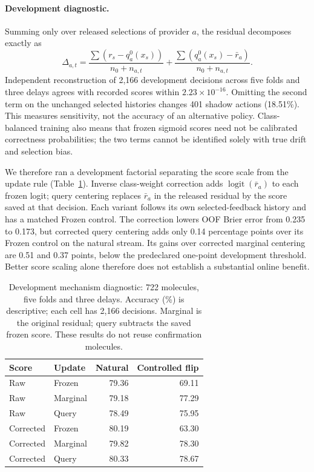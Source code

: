 \documentclass[sigconf,anonymous]{aamas}
\begin{document}
\paragraph{Development diagnostic.}
Summing only over released selections of provider $a$, the residual decomposes exactly as
\begin{equation}
\Delta_{a,t}=\frac{\sum(r_s-q_a^0(x_s))}{n_0+n_{a,t}}
            +\frac{\sum(q_a^0(x_s)-\bar r_a)}{n_0+n_{a,t}}.
\end{equation}
Independent reconstruction of 2,166 development decisions across five folds and three delays agrees with recorded scores within $2.23\times10^{-16}$. Omitting the second term on the unchanged selected histories changes 401 shadow actions (18.51\%). This measures sensitivity, not the accuracy of an alternative policy. Class-balanced training also means that frozen sigmoid scores need not be calibrated correctness probabilities; the two terms cannot be identified solely with true drift and selection bias.

We therefore ran a development factorial separating the score scale from the update rule (Table~\ref{tab:centering-diagnostic}). Inverse class-weight correction adds $\operatorname{logit}(\bar r_a)$ to each frozen logit; query centering replaces $\bar r_a$ in the released residual by the score saved at that decision. Each variant follows its own selected-feedback history and has a matched Frozen control. The correction lowers OOF Brier error from 0.235 to 0.173, but corrected query centering adds only 0.14 percentage points over its Frozen control on the natural stream. Its gains over corrected marginal centering are 0.51 and 0.37 points, below the predeclared one-point development threshold. Better score scaling alone therefore does not establish a substantial online benefit.

\begin{table}[t]
\caption{Development mechanism diagnostic: 722 molecules, five folds and three delays. Accuracy (\%) is descriptive; each cell has 2,166 decisions. Marginal is the original residual; query subtracts the saved frozen score. These results do not reuse confirmation molecules.}
\label{tab:centering-diagnostic}
\centering
\small
\begin{tabular}{@{}llrr@{}}
\toprule
Score & Update & Natural & Controlled flip \\
\midrule
Raw & Frozen & 79.36 & 69.11 \\
Raw & Marginal & 79.18 & 77.29 \\
Raw & Query & 78.49 & 75.95 \\
\midrule
Corrected & Frozen & 80.19 & 63.30 \\
Corrected & Marginal & 79.82 & 78.30 \\
Corrected & Query & 80.33 & 78.67 \\
\bottomrule
\end{tabular}
\end{table}
\end{document}
